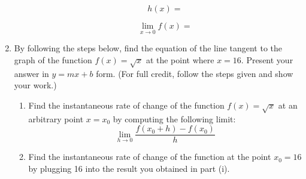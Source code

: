 \documentclass[fleqn,12pt]{article}
\newcommand{\<}{\ensuremath{\langle}}
\renewcommand{\>}{\ensuremath{\rangle}}
\begin{document}
\begin{enumerate}
\begin{enumerate}[{\it i.}]
{        \[ h(x) = \]

        \[
        \lim_{x \rightarrow 0} f(x) = 
        \]}
      \end{enumerate}



      \newpage

    \item By following the steps below, find the equation of the line tangent to the
      graph of the function  
      $f(x) = \sqrt{x}$ at the point where $x = 16$.
      Present your answer in $y = mx + b$ form.  
      (For full credit, follow the steps given and show your work.)

      \begin{enumerate}[{(i)}]
      \item Find the instantaneous rate of change of the function $f(x) = \sqrt{x}$ at an arbitrary point
        $x = x_0$ by computing the following limit:
        \[
        \lim_{h \rightarrow 0} \frac{f(x_0 + h) - f(x_0)}{h}
        \]

      \item Find the instantaneous rate of change of the
        function at the point  $x_0 = 16$ by plugging 16 into the result you obtained in part (i).





\end{enumerate}
\end{enumerate}
\end{document}
